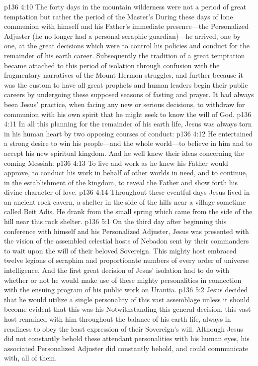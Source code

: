 \pc \vs p136 4:10 The forty days in the mountain wilderness were not a period of great temptation but rather the period of the Master’s  During these days of lone communion with himself and his Father’s immediate presence---the Personalized Adjuster (he no longer had a personal seraphic guardian)---he arrived, one by one, at the great decisions which were to control his policies and conduct for the remainder of his earth career. Subsequently the tradition of a great temptation became attached to this period of isolation through confusion with the fragmentary narratives of the Mount Hermon struggles, and further because it was the custom to have all great prophets and human leaders begin their public careers by undergoing these supposed seasons of fasting and prayer. It had always been Jesus’ practice, when facing any new or serious decisions, to withdraw for communion with his own spirit that he might seek to know the will of God.\plusone
\pc \vs p136 4:11 In all this planning for the remainder of his earth life, Jesus was always torn in his human heart by two opposing courses of conduct:
\pc \vs p136 4:12 \bibnobreakspace He entertained a strong desire to win his people---and the whole world---to believe in him and to accept his new spiritual kingdom. And he well knew their ideas concerning the coming Messiah.
\vs p136 4:13 \bibnobreakspace To live and work as he knew his Father would approve, to conduct his work in behalf of other worlds in need, and to continue, in the establishment of the kingdom, to reveal the Father and show forth his divine character of love.
\pc \vs p136 4:14 Throughout these eventful days Jesus lived in an ancient rock cavern, a shelter in the side of the hills near a village sometime called Beit Adis. He drank from the small spring which came from the side of the hill near this rock shelter.
\vs p136 5:1 On the third day after beginning this conference with himself and his Personalized Adjuster, Jesus was presented with the vision of the assembled celestial hosts of Nebadon sent by their commanders to wait upon the will of their beloved Sovereign. This mighty host embraced twelve legions of seraphim and proportionate numbers of every order of universe intelligence. And the first great decision of Jesus’ isolation had to do with whether or not he would make use of these mighty personalities in connection with the ensuing program of his public work on Urantia.
\vs p136 5:2 Jesus decided that he would  utilize a single personality of this vast assemblage unless it should become evident that this was his  Notwithstanding this general decision, this vast host remained with him throughout the balance of his earth life, always in readiness to obey the least expression of their Sovereign’s will. Although Jesus did not constantly behold these attendant personalities with his human eyes, his associated Personalized Adjuster did constantly behold, and could communicate with, all of them.
